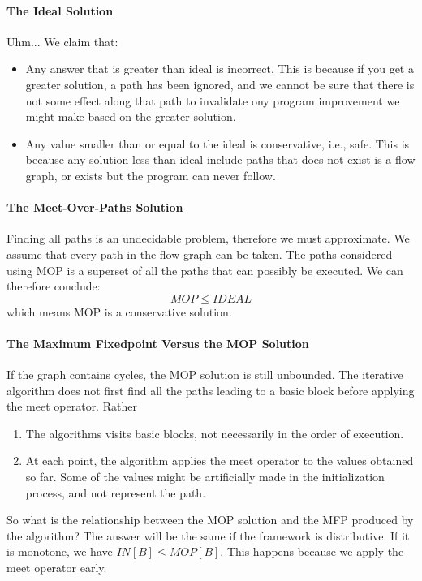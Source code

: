 \documentclass{article}
\begin{document}
\paragraph{The Ideal Solution} %
\label{par:The Ideal Solution}
Uhm... We claim that:
\begin{itemize}
	\item Any answer that is greater than ideal is incorrect. This is because if you get a greater solution, a path has been ignored, and we cannot be sure that there is not some effect along that path to invalidate ony program improvement we might make based on the greater solution.
	\item Any value smaller than or equal to the ideal is conservative, i.e., safe. This is because any solution less than ideal include paths that does not exist is a flow graph, or exists but the program can never follow.
\end{itemize}

\paragraph{The Meet-Over-Paths Solution} %
\label{par:The Meet-Over-Paths Solution}
Finding all paths is an undecidable problem, therefore we must approximate. We assume that every path in the flow graph can be taken. The paths considered using MOP is a superset of all the paths that can possibly be executed. We can therefore conclude:
\begin{equation}
	MOP \le IDEAL
\end{equation}
which means MOP is a conservative solution.

\paragraph{The Maximum Fixedpoint Versus the MOP Solution} %
\label{par:The Maximum Fixedpoint Versus the MOP Solution}
If the graph contains cycles, the MOP solution is still unbounded. The iterative algorithm does not first find all the paths leading to a basic block before applying the meet operator. Rather
\begin{enumerate}
	\item The algorithms visits basic blocks, not necessarily in the order of execution.
	\item At each point, the algorithm applies the meet operator to the values obtained so far. Some of the values might be artificially made in the initialization process, and not represent the path.
\end{enumerate}
So what is the relationship between the MOP solution and the MFP produced by the algorithm? The answer will be the same if the framework is distributive. If it is monotone, we have $IN[B] \le MOP[B]$. This happens because we apply the meet operator early.
\end{document}
